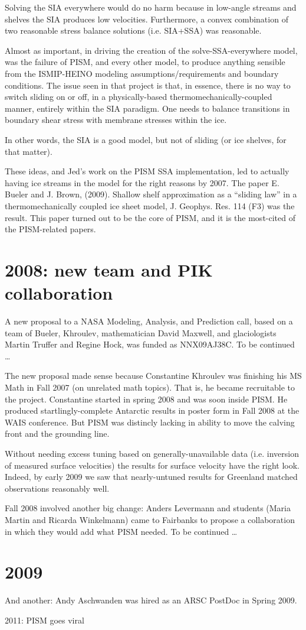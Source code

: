 \documentclass[11pt]{article}
\begin{document}
Solving the SIA everywhere would do no harm because in low-angle streams and shelves the SIA produces low velocities. Furthermore, a convex combination of two reasonable stress balance solutions (i.e. SIA+SSA) was reasonable.

Almost as important, in driving the creation of the solve-SSA-everywhere model, was the failure of PISM, and every other model, to produce anything sensible from the ISMIP-HEINO modeling assumptions/requirements and boundary conditions. The issue seen in that project is that, in essence, there is no way to switch sliding on or off, in a physically-based thermomechanically-coupled manner, entirely within the SIA paradigm. One needs to balance transitions in boundary shear stress with membrane stresses within the ice.

In other words, the SIA is a good model, but not of sliding (or ice shelves, for that matter).

These ideas, and Jed's work on the PISM SSA implementation, led to actually having ice streams in the model for the right reasons by 2007. The paper E. Bueler and J. Brown, (2009). Shallow shelf approximation as a “sliding law” in a thermomechanically coupled ice sheet model, J. Geophys. Res. 114 (F3) was the result. This paper turned out to be the core of PISM, and it is the most-cited of the PISM-related papers.

\section*{2008: new team and PIK collaboration}

A new proposal to a NASA Modeling, Analysis, and Prediction call, based on a team of Bueler, Khroulev, mathematician David Maxwell, and glaciologists Martin Truffer and Regine Hock, was funded as NNX09AJ38C. To be continued …

The new proposal made sense because Constantine Khroulev was finishing his MS Math in Fall 2007 (on unrelated math topics). That is, he became recruitable to the project. Constantine started in spring 2008 and was soon inside PISM. He produced startlingly-complete Antarctic results in poster form in Fall 2008 at the WAIS conference. But PISM was distincly lacking in ability to move the calving front and the grounding line.

Without needing excess tuning based on generally-unavailable data (i.e. inversion of measured surface velocities) the results for surface velocity have the right look. Indeed, by early 2009 we saw that nearly-untuned results for Greenland matched observations reasonably well.

Fall 2008 involved another big change: Anders Levermann and students (Maria Martin and Ricarda Winkelmann) came to Fairbanks to propose a collaboration in which they would add what PISM needed. To be continued …

\section*{2009}
And another: Andy Aschwanden was hired as an ARSC PostDoc in Spring 2009.

2011: PISM goes viral
\end{document}
